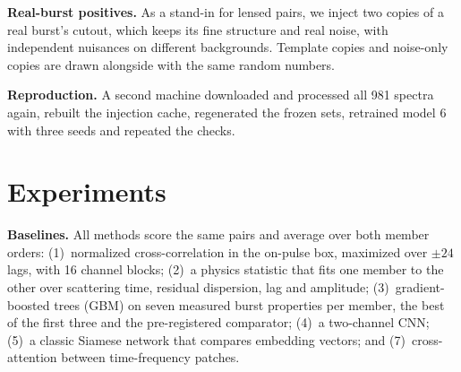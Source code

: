 \documentclass[conference]{IEEEtran}
\begin{document}
\textbf{Real-burst positives.} As a stand-in for lensed pairs, we inject two copies of a real burst's cutout, which keeps
its fine structure and real noise, with independent nuisances on different backgrounds. Template copies and noise-only
copies are drawn alongside with the same random numbers.

\textbf{Reproduction.} A second machine downloaded and processed all 981 spectra again, rebuilt the injection cache,
regenerated the frozen sets, retrained model 6 with three seeds and repeated the checks.

\section{Experiments}
\label{sec:results}
\textbf{Baselines.} All methods score the same pairs and average over both member orders: (1)~normalized cross-correlation
in the on-pulse box, maximized over $\pm24$ lags, with 16 channel blocks; (2)~a physics statistic that fits one member to the
other over scattering time, residual dispersion, lag and amplitude; (3)~gradient-boosted trees (GBM) on seven measured burst
properties per member, the best of the first three and the pre-registered comparator; (4)~a two-channel CNN; (5)~a classic
Siamese network that compares embedding vectors; and (7)~cross-attention between time-frequency patches.
\end{document}
